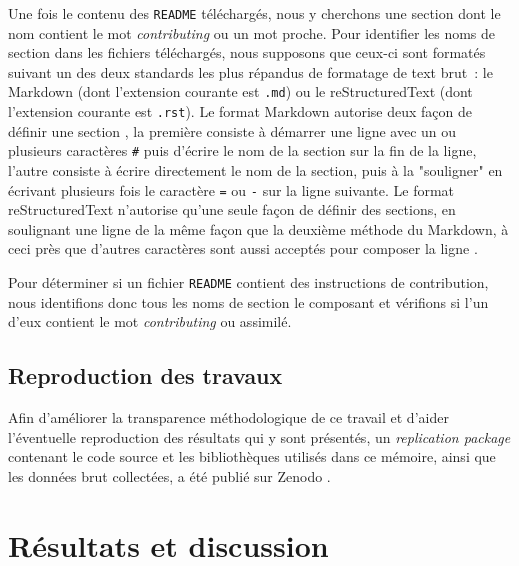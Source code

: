 \documentclass[dvipsnames]{llncs}
\newcommand{\en}[1]{\foreignlanguage{english}{\emph{#1}}}
\begin{document}
    Une fois le contenu des \texttt{README} téléchargés, nous y cherchons une section dont le nom contient le
    mot \en{contributing} ou un mot proche. Pour identifier les noms de section dans les fichiers téléchargés,
    nous supposons que ceux-ci sont formatés suivant un des deux standards les plus répandus de formatage de
    text brut : le Markdown (dont l'extension courante est \texttt{.md}) ou le reStructuredText (dont
    l'extension courante est \texttt{.rst}). Le format Markdown autorise deux façon de définir une section
    \parencite{markdown-headings}, la première consiste à démarrer une ligne avec un ou plusieurs caractères
    \texttt{\#} puis d'écrire le nom de la section sur la fin de la ligne, l'autre consiste à écrire
    directement le nom de la section, puis à la "souligner" en écrivant plusieurs fois le caractère \texttt{=}
    ou \texttt{-} sur la ligne suivante. Le format reStructuredText n'autorise qu'une seule façon de définir
    des sections, en soulignant une ligne de la même façon que la deuxième méthode du Markdown, à ceci près
    que d'autres caractères sont aussi acceptés pour composer la ligne \parencite{rst-sections}.

    Pour déterminer si un fichier \texttt{README} contient des instructions de contribution, nous identifions
    donc tous les noms de section le composant et vérifions si l'un d'eux contient le mot \en{contributing} ou
    assimilé.

    \subsection{Reproduction des travaux}

    Afin d'améliorer la transparence méthodologique de ce travail et d'aider l'éventuelle reproduction des
    résultats qui y sont présentés, un \en{replication package} contenant le code source et les bibliothèques
    utilisés dans ce mémoire, ainsi que les données brut collectées, a été publié sur Zenodo
    \parencite{replication-package}.

    \section{Résultats et discussion}

    \captionsetup[figure]{format=plain,singlelinecheck=true,justification=centering}
    \captionsetup[subfigure]{format=plain,singlelinecheck=true,justification=centering}
    \captionsetup[table]{format=plain,singlelinecheck=true,justification=centering}
\end{document}
